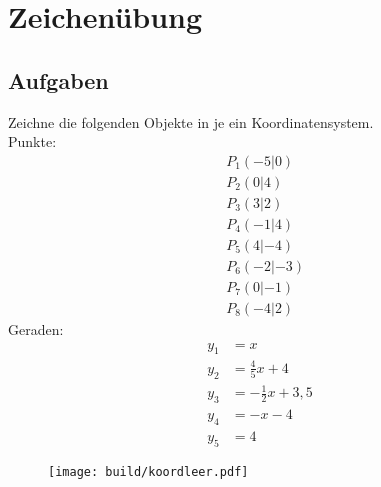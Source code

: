 


    \section*{Zeichenübung}
    \subsection*{Aufgaben}
    Zeichne die folgenden Objekte in je ein Koordinatensystem.\\
    Punkte:
    \begin{align}
        &P_1(-5|0)\\
        &P_2(0|4)\\
        &P_3(3|2)\\
        &P_4(-1|4)\\
        &P_5(4|-4)\\
        &P_6(-2|-3)\\
        &P_7(0|-1)\\
        &P_8(-4|2)
    \end{align}
    Geraden:
    \begin{align}
        y_1&=x\\
        y_2&=\frac{4}{5}x+4\\
        y_3&=-\frac{1}{2}x+3,5\\
        y_4&=-x-4\\
        y_5&=4
    \end{align}
    \begin{figure}
        \centering
        \texttt{[image: build/koordleer.pdf]}
    \end{figure}
    
